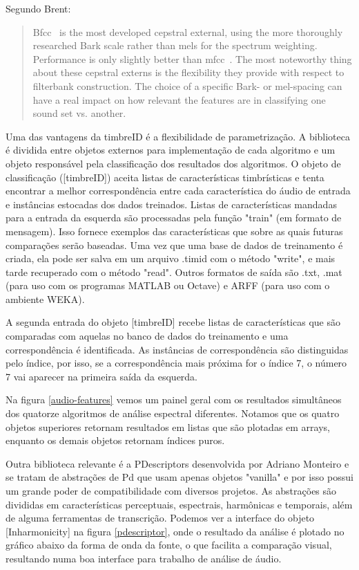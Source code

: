 \documentclass{ppgmus}
\begin{document}
Segundo Brent:

\begin{quotation}
 Bfcc~ is the most developed cepstral external, using the more thoroughly researched Bark scale rather than mels for 
the spectrum weighting. Performance is only slightly better than mfcc~. The most noteworthy thing about these cepstral 
externs is the flexibility they provide with respect to filterbank construction. The choice of a specific Bark- or 
mel-spacing can have a real impact on how relevant the features are in classifying one sound set vs. another.
\end{quotation}


Uma das vantagens da timbreID é a flexibilidade de parametrização. A biblioteca é dividida
entre objetos externos para implementação de cada algoritmo e um objeto responsável pela
classificação dos resultados dos algoritmos. O objeto de classificação ([timbreID]) aceita
listas de características timbrísticas e tenta encontrar a melhor correspondência entre cada 
característica do áudio de entrada e instâncias estocadas dos dados treinados.
Listas de características mandadas para a entrada da esquerda são processadas pela função
"train" (em formato de mensagem). Isso fornece exemplos das características que sobre as quais
futuras comparações serão baseadas. Uma vez que uma base de dados de treinamento é criada, ela
pode ser salva em um arquivo .timid com o método "write", e mais tarde recuperado com o método
"read". Outros formatos de saída são .txt, .mat (para uso com os programas MATLAB ou Octave)
e ARFF (para uso com o ambiente WEKA).

A segunda entrada do objeto [timbreID] recebe listas de características que são comparadas com
aquelas no banco de dados do treinamento e uma correspondência é identificada. As instâncias de 
correspondência são distinguidas pelo índice, por isso, se a correspondência mais próxima for o 
índice 7, o número 7 vai aparecer na primeira saída da esquerda.

Na figura \ref{audio-features} vemos um painel geral com os resultados simultâneos dos quatorze
algoritmos de análise espectral diferentes. Notamos que os quatro objetos superiores retornam resultados em 
listas que são plotadas em arrays, enquanto os demais objetos retornam índices puros.

Outra  biblioteca relevante é a PDescriptors desenvolvida 
por Adriano Monteiro e se tratam
de abstrações de Pd que usam apenas objetos "vanilla" e por isso possui um
grande poder de compatibilidade com diversos projetos. As abstrações
são divididas em características perceptuais, espectrais, harmônicas e temporais, além
de alguma ferramentas de transcrição. Podemos ver a interface do objeto [Inharmonicity\texttildelow]
na figura \ref{pdescriptor}, onde o resultado da análise é plotado no gráfico abaixo da forma de 
onda da fonte, o que facilita a comparação visual, resultando numa boa interface para trabalho de análise de áudio.
\end{document}
